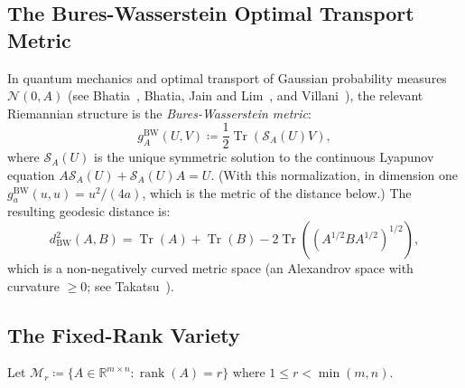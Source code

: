 \documentclass[11pt,a4paper,reqno]{amsart}
\theoremstyle{definition}
\numberwithin{equation}{section}
\providecommand{\R}{\mathbb{R}}
\newcommand{\Tr}{\operatorname{Tr}}
\newcommand{\rank}{\operatorname{rank}}
\providecommand{\R}{\mathbb{R}}
\begin{document}
\subsection{The Bures-Wasserstein Optimal Transport Metric}
In quantum mechanics and optimal transport of Gaussian probability measures $\mathcal{N}(0, A)$ (see Bhatia~\cite{bhatia2009positive}, Bhatia, Jain and Lim~\cite{bhatia2019bures}, and Villani~\cite{villani2009optimal}), the relevant Riemannian structure is the \emph{Bures-Wasserstein metric}:
\begin{equation}
    \label{eq:bures_metric}
    g_A^{\mathrm{BW}}(U, V) \coloneqq \frac{1}{2} \Tr(\mathcal{S}_A(U) V),
\end{equation}
where $\mathcal{S}_A(U)$ is the unique symmetric solution to the continuous Lyapunov equation $A \mathcal{S}_A(U) + \mathcal{S}_A(U) A = U$. (With this normalization, in dimension one $g^{\mathrm{BW}}_a(u,u) = u^2/(4a)$, which is the metric of the distance below.) The resulting geodesic distance is:
\begin{equation}
    d_{\mathrm{BW}}^2(A, B) = \Tr(A) + \Tr(B) - 2 \Tr\left((A^{1/2} B A^{1/2})^{1/2}\right),
\end{equation}
which is a non-negatively curved metric space (an Alexandrov space with curvature $\ge 0$; see Takatsu~\cite{takatsu2010wasserstein}).

\subsection{The Fixed-Rank Variety}
\label{subsec:fixed_rank}
Let $\mathcal{M}_r \coloneqq \{A \in \R^{m \times n} \colon \rank(A) = r\}$ where $1 \le r < \min(m, n)$.
\end{document}

